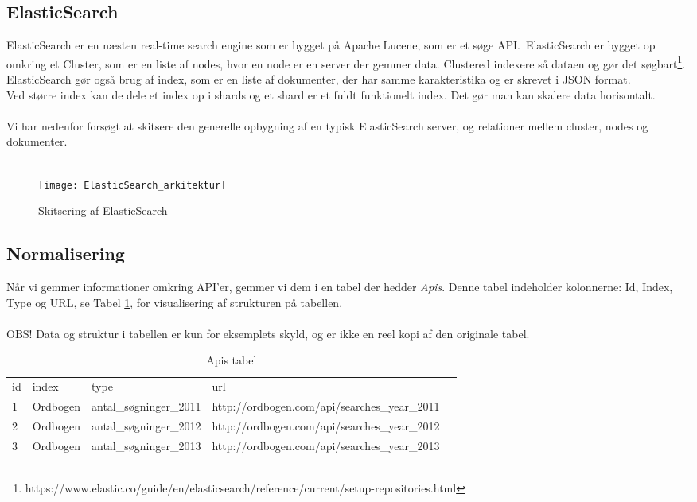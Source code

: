 \subsection{ElasticSearch}
ElasticSearch er en næsten real-time search engine som er bygget på Apache Lucene, som er et søge API.\
ElasticSearch er bygget op omkring et Cluster, som er en liste af nodes, hvor en node er en server der gemmer data. Clustered indexere så dataen og gør det søgbart\footnote{https://www.elastic.co/guide/en/elasticsearch/reference/current/setup-repositories.html}.
ElasticSearch gør også brug af index, som er en liste af dokumenter, der har samme karakteristika og er skrevet i JSON format.
\\
Ved større index kan de dele et index op i shards og et shard er et fuldt funktionelt index. Det gør man kan skalere data horisontalt.
\\\\
Vi har nedenfor forsøgt at skitsere den generelle opbygning af en typisk ElasticSearch server, og relationer mellem cluster, nodes og dokumenter.
\\\\
\begin{figure}[here]
    \texttt{[image: ElasticSearch\_arkitektur]}
    \caption{Skitsering af ElasticSearch}
    \label{fig:elasticsearch-arkitektur}
\end{figure}
\subsection{Normalisering}
Når vi gemmer informationer omkring API'er, gemmer vi dem i en tabel der hedder \textit{Apis}. Denne tabel indeholder kolonnerne: Id, Index, Type og URL, se Tabel \ref{api-tabel}, for visualisering af strukturen på tabellen.
\\\\
OBS! Data og struktur i tabellen er kun for eksemplets skyld, og er ikke en reel kopi af den originale tabel.
\begin{table}[here]
    \centering
    \label{api-tabel}
    \begin{tabular}{|l|l|l|l|l}
        \cline{1-4}
        id & index  &  type &  url &  \\ \cline{1-4}
        1 & Ordbogen & antal\_søgninger\_2011 & http://ordbogen.com/api/searches\_year\_2011 &  \\ \cline{1-4}
        2 & Ordbogen & antal\_søgninger\_2012 & http://ordbogen.com/api/searches\_year\_2012 &  \\ \cline{1-4}
        3 & Ordbogen & antal\_søgninger\_2013 & http://ordbogen.com/api/searches\_year\_2013 &  \\ \cline{1-4}
    \end{tabular}
    \caption{Apis tabel}
\end{table}

